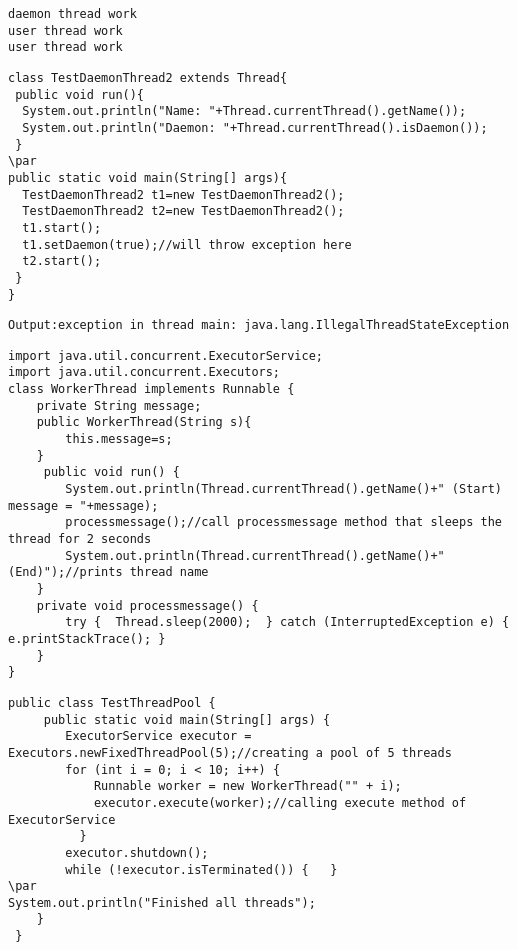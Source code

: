 \documentclass{book}
\def\lthtmlcheckvsize{\ifdim\ht\sizebox<\vsize 
  \ifdim\wd\sizebox<\hsize\expandafter\hfill\fi \expandafter\vfill
  \else\expandafter\vss\fi}%
\begin{document}
{\newpage\clearpage
{}%
\begin{lstlisting}
daemon thread work
user thread work
user thread work
\end{lstlisting}%
\lthtmlfigureZ
\lthtmlcheckvsize\clearpage}

{\newpage\clearpage
{}%
\begin{lstlisting}
class TestDaemonThread2 extends Thread{  
 public void run(){  
  System.out.println("Name: "+Thread.currentThread().getName());  
  System.out.println("Daemon: "+Thread.currentThread().isDaemon());  
 }  
\par
public static void main(String[] args){  
  TestDaemonThread2 t1=new TestDaemonThread2();  
  TestDaemonThread2 t2=new TestDaemonThread2();  
  t1.start();  
  t1.setDaemon(true);//will throw exception here  
  t2.start();  
 }  
}  
\end{lstlisting}%
\lthtmlfigureZ
\lthtmlcheckvsize\clearpage}

{\newpage\clearpage
{}%
\begin{lstlisting}
Output:exception in thread main: java.lang.IllegalThreadStateException
\end{lstlisting}%
\lthtmlfigureZ
\lthtmlcheckvsize\clearpage}

{\newpage\clearpage
{}%
\begin{lstlisting}
import java.util.concurrent.ExecutorService;  
import java.util.concurrent.Executors;  
class WorkerThread implements Runnable {  
    private String message;  
    public WorkerThread(String s){  
        this.message=s;  
    }  
     public void run() {  
        System.out.println(Thread.currentThread().getName()+" (Start) message = "+message);  
        processmessage();//call processmessage method that sleeps the thread for 2 seconds  
        System.out.println(Thread.currentThread().getName()+" (End)");//prints thread name  
    }  
    private void processmessage() {  
        try {  Thread.sleep(2000);  } catch (InterruptedException e) { e.printStackTrace(); }  
    }  
}  
\end{lstlisting}%
\lthtmlfigureZ
\lthtmlcheckvsize\clearpage}

{\newpage\clearpage
{}%
\begin{lstlisting}
public class TestThreadPool {  
     public static void main(String[] args) {  
        ExecutorService executor = Executors.newFixedThreadPool(5);//creating a pool of 5 threads  
        for (int i = 0; i < 10; i++) {  
            Runnable worker = new WorkerThread("" + i);  
            executor.execute(worker);//calling execute method of ExecutorService  
          }  
        executor.shutdown();  
        while (!executor.isTerminated()) {   }  
\par
System.out.println("Finished all threads");  
    }  
 }  
\end{lstlisting}%
\lthtmlfigureZ
\lthtmlcheckvsize\clearpage}
\end{document}
